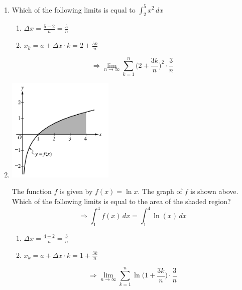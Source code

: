 \documentclass[12pt]{article}
\begin{document}
\begin{enumerate}
   \item Which of the following limits is equal to $\int_{2}^{5} x^2 \, dx$
   \begin{enumerate}
        \item $\Delta x = \frac{5-2}{n} = \frac{5}{n}$
        \item $x_k = a + \Delta x \cdot k  =  2 + \frac{5k}{n}$
    \end{enumerate}
    $$\Longrightarrow \boxed{\lim_{n\to\infty} \sum_{k=1}^{n} \biggr(2+ \frac{3k}{n} \biggr)^2 \cdot \frac{3}{n}}$$
    \item 
    \begin{center}
        \includegraphics[width=2in]{original-26.png}
    \end{center}
    The function $f$ is given by $f(x) = \ln x$. The graph of $f$ is shown above. Which of the following limits is equal to the area of the shaded region?
    $$\Longrightarrow \int_{1}^{4} f(x) \, dx = \int_{1}^{4} \ln(x) \, dx  $$
    \begin{enumerate}
        \item $\Delta x = \frac{4-2}{n} = \frac{3}{n}$
        \item $x_k = a + \Delta x \cdot k  =  1 + \frac{3k}{n}$
    \end{enumerate}
      $$\Longrightarrow \boxed{\lim_{n\to\infty} \sum_{k=1}^{n} \ln \biggr(1+ \frac{3k}{n}\biggr) \cdot \frac{3}{n}}$$
\end{enumerate}
\end{document}
